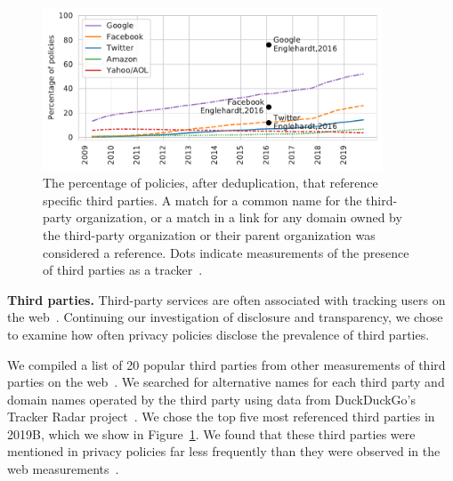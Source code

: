 \begin{figure}
    \centering
    \includegraphics[width=0.9\textwidth]{chapters/privacypolicies/figures/trackers.pdf}
    \caption[Third party trends]{The percentage of policies, after deduplication, that reference specific third parties. A match for a common name for the third-party organization, or a match in a link for any domain owned by the third-party organization or their parent organization was considered a reference. Dots indicate measurements of the presence of third parties as a tracker~\cite{englehardt2016online}.}
    \label{fig:trackers}
\end{figure}

\textbf{Third parties.} Third-party services are often associated with tracking users on the web~\cite{englehardt2016online}. Continuing our investigation of disclosure and transparency, we chose to examine how often privacy policies disclose the prevalence of third parties.

We compiled a list of 20 popular third parties from other measurements of third parties on the web~\cite{trackerradar, englehardt2016online,lerner2016internet}. We searched for alternative names for each third party and domain names operated by the third party using data from DuckDuckGo's Tracker Radar project~\cite{trackerradar}. We chose the top five most referenced third parties in 2019B, which we show in Figure~\ref{fig:trackers}. We found that these third parties were mentioned in privacy policies far less frequently than they were observed in the web measurements~\cite{trackerradar,englehardt2016online}. 


